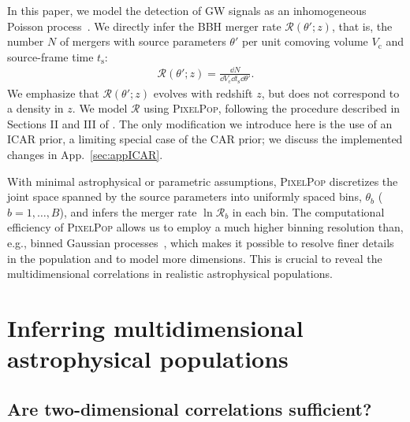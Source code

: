 \documentclass[twocolumn, twocolappendix]{aastex631}
\newcommand{\PixelPop}{\textsc{PixelPop}\xspace}
\begin{document}
In this paper, we model the detection of \ac{GW} signals as an inhomogeneous Poisson process~\citep{Mandel:2018mve,Thrane:2018qnx,Vitale:2020aaz,Essick:2023upv}. We directly infer the \ac{BBH} merger rate $\mathcal{R}(\theta';z)$, that is, the number $N$ of mergers with source parameters $\theta'$ per unit comoving volume $V_\mathrm{c}$ and source-frame time $t_\mathrm{s}$:
\begin{align}
\label{eq:source-frame-rate}
\mathcal{R} ( \theta' ; z )
=
\frac
{ \dd{N} }
{ \dd{V_\mathrm{c}} \dd{t_\mathrm{s}} \dd{\theta'} }.
\end{align}
We emphasize that $\mathcal{R}(\theta';z)$ evolves with redshift $z$, but does not correspond to a density in $z$. We model $\mathcal{R}$ using \PixelPop, following the procedure described in Sections II and III of \citet{Heinzel:2024jlc}. The only modification we introduce here is the use of an \ac{ICAR} prior, a limiting special case of the \ac{CAR} prior; we discuss the implemented changes in App.~\ref{sec:appICAR}.

With minimal astrophysical or parametric assumptions, \PixelPop discretizes the joint space spanned by the source parameters into uniformly spaced bins, $\theta_b$ ($b = 1,\ldots,B$), and infers the merger rate $\ln\mathcal{R}_b$ in each bin. The computational efficiency of \PixelPop allows us to employ a much higher binning resolution than, e.g., binned Gaussian processes~\citep{Ray:2023upk,KAGRA:2021duu}, which makes it possible to resolve finer details in the population and to model more dimensions. This is crucial to reveal the multidimensional correlations in realistic astrophysical populations.


\section{Inferring multidimensional astrophysical populations}
\label{sec:results}

\subsection{Are two-dimensional correlations sufficient?}
\label{sec:2d-inference}
\end{document}
